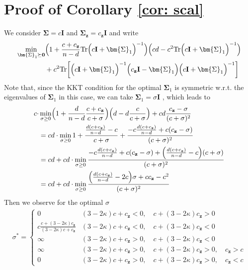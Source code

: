 \documentclass[final]{l4dc2026}
\newcommand{\bSigma}{\bm{\Sigma}}
\newcommand{\bI}{\mathbf{I}}
\newcommand{\bz}{\mathbf{z}}
\newcommand{\bzero}{\mathbf{0}}
\newcommand{\tr}{\text{Tr}}
\begin{document}
\section{Proof of Corollary \ref{cor: scal}}
We consider $\bSigma = c \bI$ and $\bSigma_{\bz} = c_{\bz} \bI$ and write
\begin{align*}
    \min_{\bSigma_1 \succeq \bzero}& \Bigl(1 + \frac{c+c_{\bz}}{n-d} \tr\Bigl( c \bI + \bSigma_1 \Bigr)^{-1}\Bigr) \Bigl(cd - c^2  \tr\Bigl( c \bI + \bSigma_1 \Bigr)^{-1} \Bigr) \\
    &+ c^2 \tr\biggl[\Bigl( c \bI + \bSigma_1 \Bigr)^{-1}\Bigl( c_{\bz} \bI - \bSigma_1 \Bigr) \Bigl( c \bI + \bSigma_1 \Bigr)^{-1}\biggr]
\end{align*}
Note that, since the KKT condition for the optimal $\bSigma_1$ is symmetric w.r.t. the eigenvalues of $\bSigma_1$ in this case, we can take  $\bSigma_1 = \sigma \bI$ , which leads to
\begin{align*}
    c \cdot &\min_{\sigma \ge 0} \Bigl(1 + \frac{d}{n-d} \frac{c+c_{\bz}}{c+\sigma}\Bigr) \Bigl(d - d\frac{c}{c+\sigma} \Bigr) + c d \frac{c_{\bz}- \sigma}{(c+\sigma)^2} \\ 
    &= c d \cdot \min_{\sigma \ge 0}  1 + \frac{\frac{d (c+c_{\bz})}{n-d} - c}{c+\sigma} + \frac{-c\frac{d (c+c_{\bz})}{n-d} + c(c_{\bz}- \sigma)}{(c+\sigma)^2} \\ 
    &= cd + cd \cdot \min_{\sigma \ge 0}  \frac{-c\frac{d (c+c_{\bz})}{n-d} + c(c_{\bz}- \sigma) + \Bigl(\frac{d (c+c_{\bz})}{n-d} - c\Bigr) (c+\sigma)}{(c+\sigma)^2} \\
    &=  cd +  cd \cdot \min_{\sigma \ge 0}  \frac{\Bigl(\frac{d (c+c_{\bz})}{n-d} - 2c\Bigr) \sigma + cc_{\bz} - c^2}{(c+\sigma)^2} 
\end{align*}
Then we observe for the optimal $\sigma$
\begin{align*}
    \sigma^\ast = \begin{cases}
        0 & (3-2\kappa) c + c_{\bz} < 0 ,\quad  c + (3 - 2\kappa) c_{\bz} > 0 \\
        c \frac{ c + (3 - 2\kappa) c_{\bz}}{(3-2\kappa) c + c_{\bz}} & (3-2\kappa) c + c_{\bz} < 0 , \quad c + (3 - 2\kappa) c_{\bz} < 0 \\
        \infty & (3-2\kappa) c + c_{\bz} > 0 ,\quad  c + (3 - 2\kappa) c_{\bz} < 0 \\
        \infty & (3-2\kappa) c + c_{\bz} > 0 ,\quad  c + (3 - 2\kappa) c_{\bz} > 0, \quad c_{\bz} > c \\
        0 & (3-2\kappa) c + c_{\bz} > 0 ,\quad  c + (3 - 2\kappa) c_{\bz} > 0, \quad c_{\bz} < c
    \end{cases}
\end{align*}
\end{document}
